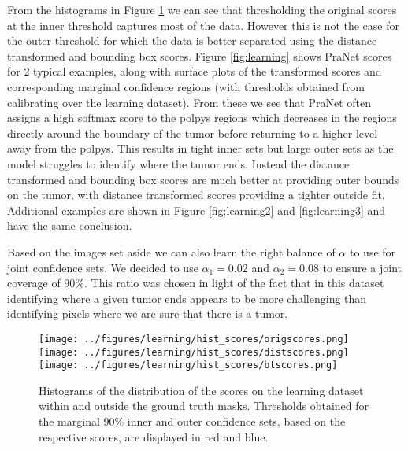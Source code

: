 From the histograms in Figure \ref{scorehists} we can see that thresholding the original scores at the inner threshold captures most of the data. However this is not the case for the outer threshold for which the data is better separated using the distance transformed and bounding box scores. Figure \ref{fig:learning} shows PraNet scores for 2 typical examples, along with surface plots of the transformed scores and corresponding marginal confidence regions (with thresholds obtained from calibrating over the learning dataset). From these we see that PraNet often assigns a high softmax score to the polpys regions which decreases in the regions directly around the  boundary of the tumor before returning to a higher level away from the polpys. This results in tight inner sets but large outer sets as the model struggles to identify where the tumor ends. Instead the distance transformed and bounding box scores are much better at providing outer bounds on the tumor, with distance transformed scores providing a tighter outside fit. Additional examples are shown in Figure \ref{fig:learning2} and \ref{fig:learning3} and have the same conclusion.

Based on the images set aside we can also learn the right balance of $\alpha$ to use for joint confidence sets. We decided to use $\alpha_1 = 0.02$ and $\alpha_2 = 0.08$ to ensure a joint coverage of $90\%$. This ratio was chosen in light of the fact that in this dataset identifying where a given tumor ends appears to be more challenging than identifying pixels where we are sure that there is a tumor.

\begin{figure}
		\centering
		\texttt{[image: ../figures/learning/hist\_scores/origscores.png]}
		\texttt{[image: ../figures/learning/hist\_scores/distscores.png]}
		\texttt{[image: ../figures/learning/hist\_scores/btscores.png]}
		\caption{Histograms of the distribution of the scores on the learning dataset within and outside the ground truth masks. Thresholds obtained for the marginal $90\%$ inner and outer confidence sets, based on the respective scores, are displayed in red and blue.}
		\label{scorehists}
\end{figure}


